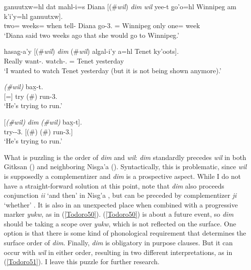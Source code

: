 \documentclass[output=paper]{langscibook}
\begin{document}
\begin{exe}
\ex \label{Todoro49}
\begin{xlist}

\ex \label{Todoro49a}
 {g̱anuutxw=hl}  {dat} 	  { mahl-i=s}	{ Diana}  [(\#{\textit{wil}}) {\textit{dim}}   {\textit{wil}}     {yee-t}   {g̱o’o=h}l { Winnipeg} {am} {k’i’y=hl}	{g̱anuutxw}]. \\
     two= weeks=    	when 	   tell- Diana	   go-3.{\seriesII}  =  Winnipeg  only one=    week\\
\glt `Diana said two weeks ago that she would go to Winnipeg.' 

\ex \label{Todoro49b}
 	   {hasag̱-a’y}     [(\#{\textit{wil}}) \textit{{dim}} (\#\textit{{wil}})	{alg̱al-i’y} 		{a=hl}		{Tenet}		{ky’oots}]. \\
	Really want-{\sg}.{\seriesII}       	watch-{\sg}.{\seriesII} 	= 	Tenet 		yesterday\\
\glt `I wanted to watch Tenet yesterday (but it is not being shown anymore).' 

\ex \label{Todoro49c}
 	\textit{(\#{wil})} 	{bax̱-t}.\\
		[=]	try	(\#)	run-3.{\seriesII} \\
\glt ‘He’s trying to run.' 

\ex \label{Todoro49d}
	 [\textit{(\#{wil})}  \textit{{dim}}		\textit{(\#{wil})} {bax̱-t}]. \\
	try--3.{\seriesII}	 [(\#)    	(\#)	run-3.{\seriesII}]\\
\glt `He’s trying to run.' 

\end{xlist}
\end{exe}

What is puzzling is the order of \emph{dim} and \emph{wil}: \emph{dim} standardly precedes \emph{wil} in both Gitksan (\citealt{rigsby1986a}) and neighboring Nisga’a (\citealt{tarpent1987a}). Syntactically, this is problematic, since \emph{wil} is supposedly a complementizer and \emph{dim} is a prospective aspect. While I do not have a straight-forward solution at this point, note that \emph{dim} also proceeds conjunction \emph{ii} ‘and then’ in Nisg’a \citep[434]{tarpent1987a}, but can be preceded by complementizer \emph{ji} ‘whether’ \citep[430]{tarpent1987a}. It is also in an unexpected place when combined with a progressive marker \textit{yukw}, as in (\ref{Todoro50}). (\ref{Todoro50}) is about a future event, so \emph{dim} should be taking a scope over \emph{yukw}, which is not reflected on the surface. One option is that there is some kind of phonological requirement that determines the surface order of \emph{dim}. Finally, \emph{dim} is obligatory in purpose clauses. But it can occur with \emph{wil} in either order, resulting in two different interpretations, as in (\ref{Todoro51}). I leave this puzzle for further research.\largerpage[1]
\end{document}
